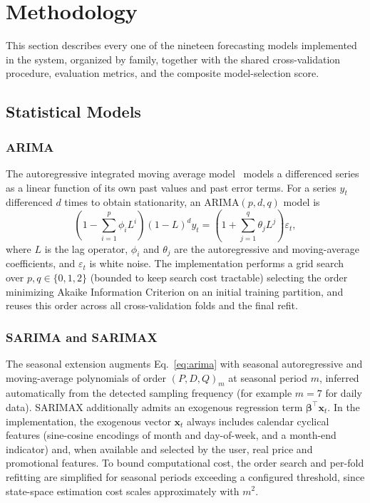 \section{Methodology}
\label{sec:methodology}

This section describes every one of the nineteen forecasting models implemented in the system, organized by family, together with the shared cross-validation procedure, evaluation metrics, and the composite model-selection score.

\subsection{Statistical Models}

\subsubsection{ARIMA}
The autoregressive integrated moving average model~\cite{boxjenkins1970} models a differenced series as a linear function of its own past values and past error terms. For a series $y_t$ differenced $d$ times to obtain stationarity, an ARIMA$(p,d,q)$ model is
\begin{equation}
\label{eq:arima}
\left(1 - \sum_{i=1}^{p}\phi_i L^i\right)(1-L)^d y_t = \left(1 + \sum_{j=1}^{q}\theta_j L^j\right)\varepsilon_t,
\end{equation}
where $L$ is the lag operator, $\phi_i$ and $\theta_j$ are the autoregressive and moving-average coefficients, and $\varepsilon_t$ is white noise. The implementation performs a grid search over $p,q \in \{0,1,2\}$ (bounded to keep search cost tractable) selecting the order minimizing Akaike Information Criterion on an initial training partition, and reuses this order across all cross-validation folds and the final refit.

\subsubsection{SARIMA and SARIMAX}
The seasonal extension augments Eq.~\eqref{eq:arima} with seasonal autoregressive and moving-average polynomials of order $(P,D,Q)_m$ at seasonal period $m$, inferred automatically from the detected sampling frequency (for example $m=7$ for daily data). SARIMAX additionally admits an exogenous regression term $\boldsymbol{\beta}^\top \mathbf{x}_t$. In the implementation, the exogenous vector $\mathbf{x}_t$ always includes calendar cyclical features (sine-cosine encodings of month and day-of-week, and a month-end indicator) and, when available and selected by the user, real price and promotional features. To bound computational cost, the order search and per-fold refitting are simplified for seasonal periods exceeding a configured threshold, since state-space estimation cost scales approximately with $m^2$.

